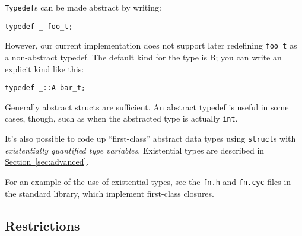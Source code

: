 \texttt{Typedef}s can be made abstract by writing:
\begin{verbatim}
typedef _ foo_t;
\end{verbatim}
However, our current implementation does not support later redefining
\texttt{foo_t} as a non-abstract typedef.  The default kind for the
type is B; you can write an explicit kind like this:
\begin{verbatim}
typedef _::A bar_t;
\end{verbatim}
Generally abstract structs are sufficient.  An abstract typedef is
useful in some cases, though, such as when the abstracted type is
actually \texttt{int}.

It's also possible to code up ``first-class'' abstract data types
using \texttt{struct}s with \emph{existentially quantified type
  variables}.  Existential types are described in
\hyperref[{sec:advanced}]{Section~\ref{sec:advanced}}.

For an example of the use of existential types, see the \texttt{fn.h}
and \texttt{fn.cyc} files in the standard library, which implement
first-class closures.

\subsection{Restrictions}

